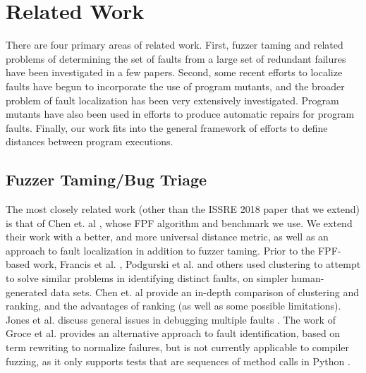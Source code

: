 \section{Related Work}
\label{sec:related}

There are four primary areas of related work.  First, fuzzer taming and related problems of determining the set of faults from a large set of redundant failures have been investigated in a few papers.  Second, some recent efforts to localize faults have begun to incorporate the use of program mutants, and the broader problem of fault localization has been very extensively investigated.  Program mutants have also been used in efforts to produce automatic repairs for program faults.  Finally, our work fits into the general framework of efforts to define distances between program executions.

\subsection{Fuzzer Taming/Bug Triage}
 
The most closely related work (other than the ISSRE 2018 \cite{ISSRE18Mutants} paper that we extend) is that of Chen et. al \cite{PLDI13}, whose FPF \cite{Gonzalez} algorithm and benchmark we use.  We extend their work with a better, and more universal distance metric, as well as an approach to fault localization in addition to fuzzer taming.  Prior to the FPF-based work, Francis et al. \cite{Podgurski04}, Podgurski et al. \cite{Podgurski03} and others \cite{Liu06,Liblit05} used clustering to attempt to solve similar problems in identifying distinct faults, on simpler human-generated data sets.  Chen et. al \cite{PLDI13} provide an in-depth comparison of clustering and ranking, and the advantages of ranking (as well as some possible limitations).  Jones et al. discuss general issues in debugging multiple faults \cite{Jones07}.  The work of Groce et al. \cite{OneTest} provides an alternative approach to fault identification, based on term rewriting to normalize failures, but is not currently applicable to compiler fuzzing, as it only supports tests that are sequences of method calls in Python \cite{ISSTA15,tstlsttt}.

